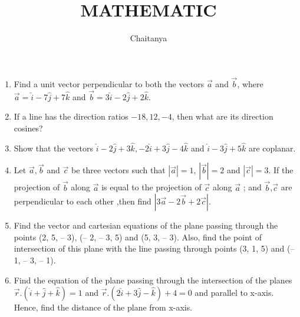 \documentclass[12pt,-letter paper]{article}
\title{\textbf{MATHEMATIC}}
\author{Chaitanya}
\begin{document}
\maketitle
\begin{enumerate}
\section{\textbf{Vectors}}
\item Find a unit vector perpendicular to both the vectors $\overrightarrow{a}$ and $\overrightarrow{b}$, where $\overrightarrow{a}= \hat{i} - 7\hat{j} + 7\hat{k}$ and $\overrightarrow{b} = 3\hat{i} - 2\hat{j} + 2\hat{k}$.
\item If a line has the direction ratios $-18, 12, -4$, then what are its direction cosines?
\item Show that the vectors $\hat{i} - 2\hat{j} + 3\hat{k}, - 2\hat{i} + 3\hat{j} - 4\hat{k} $ and $\hat{i} - 3\hat{j} + 5\hat{k}$ are coplanar.
\item Let $\overrightarrow{a},\overrightarrow{b}$ and $\overrightarrow{c}$ be three vectors such that $|\overrightarrow{a}| = 1$, $|\overrightarrow{b}| = 2$ and $|\overrightarrow{c}| = 3.$ If the projection of $\overrightarrow{b}$ along $\overrightarrow{a}$ is equal to the projection of $\overrightarrow{c}$ along $\overrightarrow{a}$ ; and $\overrightarrow{b}$,$\overrightarrow{c}$ are perpendicular to each other ,then find $|3\overrightarrow{a} - 2\overrightarrow{b} + 2\overrightarrow{c}|.$
\item Find the vector and cartesian equations of the plane passing through the points (2, 5, – 3), (– 2, – 3, 5) and (5, 3, – 3). Also, find the point of intersection of this plane with the line passing through points (3, 1, 5) and (– 1, – 3, – 1).
\item Find the equation of the plane passing through the intersection of the planes $\overrightarrow{r} . (\hat{i} +\hat{j} +\hat{k}) = 1$ and $\overrightarrow{r} . (2\hat{i} + 3\hat{j} - \hat{k}) + 4 = 0 $ and parallel to x-axis. Hence, find the distance of the plane from x-axis.
\end{enumerate}
\end{document}
